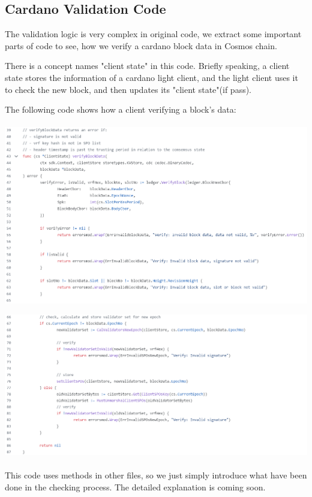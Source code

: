 \documentclass{article}
\begin{document}
\subsection{Cardano Validation Code}

The validation logic is very complex in original code, we extract some important parts of code to see, how we verify a cardano block data in Cosmos chain.

There is a concept names "client state" in this code. Briefly speaking, a client state stores the information of a cardano light client, and the light client uses it to check the new block, and then updates its "client state"(if pass).

The following code shows how a client verifying a block's data:
\\
\\


\includegraphics[width=1\linewidth]{cardano-ibc-client-cardano-update-verifyblockdata-1.png}

\includegraphics[width=1\linewidth]{cardano-ibc-client-cardano-update-verifyblockdata-2.png}
\\
\\
This code uses methods in other files, so we just simply introduce what have been done in the checking process. The detailed explanation is coming soon.
\end{document}
